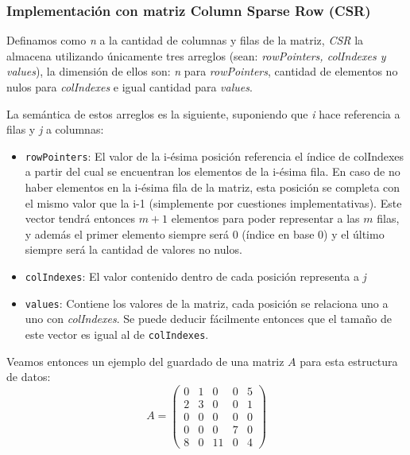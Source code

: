 \subsubsection{Implementación con matriz Column Sparse Row (CSR)}

	Definamos como \textit{n} a la cantidad de columnas y filas de la matriz, \textit{CSR} la almacena utilizando únicamente tres arreglos (sean: \textit{rowPointers, colIndexes y values}), la dimensión de ellos son: \textit{n} para \textit{rowPointers}, cantidad de elementos no nulos para \textit{colIndexes} e igual cantidad para \textit{values}.

	La semántica de estos arreglos es la siguiente, suponiendo que \textit{i} hace referencia a filas y \textit{j} a columnas:

	\begin{itemize}
		\item \texttt{rowPointers}: El valor de la i-ésima posición referencia el índice de colIndexes a partir del cual se encuentran los elementos de la i-ésima fila. En caso de no haber elementos en la i-ésima fila de la matriz, esta posición se completa con el mismo valor que la i-1 (simplemente por cuestiones implementativas). Este vector tendrá entonces $m+1$ elementos para poder representar a las $m$ filas, y además el primer elemento siempre será 0 (índice en base 0) y el último siempre será la cantidad de valores no nulos.
		\item \texttt{colIndexes}: El valor contenido dentro de cada posición representa a \textit{j}
		\item \texttt{values}: Contiene los valores de la matriz, cada posición se relaciona uno a uno con \textit{colIndexes}. Se puede deducir fácilmente entonces que el tamaño de este vector es igual al de \texttt{colIndexes}.
	\end{itemize}
	
	Veamos entonces un ejemplo del guardado de una matriz $A$ para esta estructura de datos:
\[	A =
	 \begin{pmatrix}
	 0 & 1 & 0 & 0 & 5 \\
	 2 & 3 & 0 & 0 & 1 \\
	 0 & 0 & 0 & 0 & 0 \\
	 0 & 0 & 0 & 7 & 0 \\
	 8 & 0 & 11 & 0 & 4
	 \end{pmatrix}
\]	

